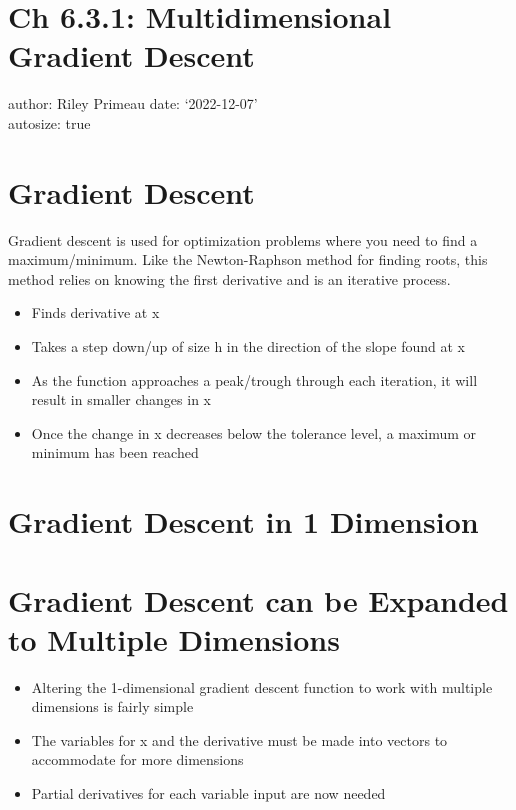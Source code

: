 \documentclass[
]{article}
\author{}
\date{\vspace{-2.5em}}
\providecommand{\tightlist}{%
  \setlength{\itemsep}{0pt}\setlength{\parskip}{0pt}}
\begin{document}
\hypertarget{ch-6.3.1-multidimensional-gradient-descent}{%
\section{Ch 6.3.1: Multidimensional Gradient
Descent}\label{ch-6.3.1-multidimensional-gradient-descent}}

author: Riley Primeau date: `2022-12-07'\\
autosize: true

\hypertarget{gradient-descent}{%
\section{Gradient Descent}\label{gradient-descent}}

Gradient descent is used for optimization problems where you need to
find a maximum/minimum. Like the Newton-Raphson method for finding
roots, this method relies on knowing the first derivative and is an
iterative process.

\begin{itemize}
\tightlist
\item
  Finds derivative at x
\item
  Takes a step down/up of size h in the direction of the slope found at
  x
\item
  As the function approaches a peak/trough through each iteration, it
  will result in smaller changes in x
\item
  Once the change in x decreases below the tolerance level, a maximum or
  minimum has been reached
\end{itemize}

\hypertarget{gradient-descent-in-1-dimension}{%
\section{Gradient Descent in 1
Dimension}\label{gradient-descent-in-1-dimension}}

\hypertarget{gradient-descent-can-be-expanded-to-multiple-dimensions}{%
\section{Gradient Descent can be Expanded to Multiple
Dimensions}\label{gradient-descent-can-be-expanded-to-multiple-dimensions}}

\begin{itemize}
\tightlist
\item
  Altering the 1-dimensional gradient descent function to work with
  multiple dimensions is fairly simple
\item
  The variables for x and the derivative must be made into vectors to
  accommodate for more dimensions
\item
  Partial derivatives for each variable input are now needed
\end{itemize}
\end{document}
